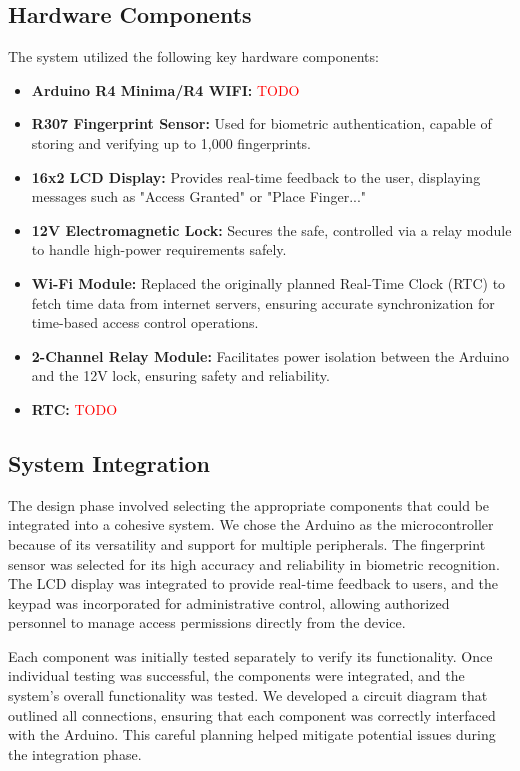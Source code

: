 \documentclass{article}
\begin{document}
\subsection{Hardware Components}
The system utilized the following key hardware components:
\begin{itemize}
    \item \textbf{Arduino R4 Minima/R4 WIFI:} \textcolor{red}{TODO}
    \item \textbf{R307 Fingerprint Sensor:} Used for biometric authentication, capable of storing and verifying up to 1,000 fingerprints.
    \item \textbf{16x2 LCD Display:} Provides real-time feedback to the user, displaying messages such as "Access Granted" or "Place Finger..."
    \item \textbf{12V Electromagnetic Lock:} Secures the safe, controlled via a relay module to handle high-power requirements safely.
    \item \textbf{Wi-Fi Module:} Replaced the originally planned Real-Time Clock (RTC) to fetch time data from internet servers, ensuring accurate synchronization for time-based access control operations.
    \item \textbf{2-Channel Relay Module:} Facilitates power isolation between the Arduino and the 12V lock, ensuring safety and reliability.
    \item \textbf{RTC: } \textcolor{red}{TODO}
\end{itemize}

\subsection{System Integration}
The design phase involved selecting the appropriate components that could be integrated into a cohesive system. We chose the Arduino as the microcontroller because of its versatility and support for multiple peripherals. The fingerprint sensor was selected for its high accuracy and reliability in biometric recognition. The LCD display was integrated to provide real-time feedback to users, and the keypad was incorporated for administrative control, allowing authorized personnel to manage access permissions directly from the device.

Each component was initially tested separately to verify its functionality. Once individual testing was successful, the components were integrated, and the system's overall functionality was tested. We developed a circuit diagram that outlined all connections, ensuring that each component was correctly interfaced with the Arduino. This careful planning helped mitigate potential issues during the integration phase.
\end{document}

